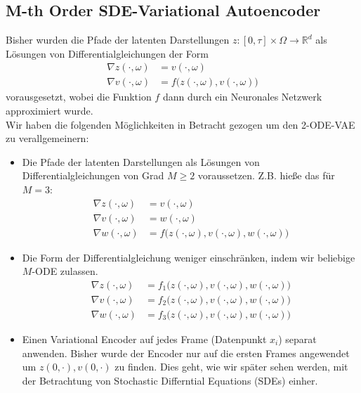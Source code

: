 \documentclass[12pt]{article}
\newcommand{\R}{\mathbb{R}}
\begin{document}
	\subsection[SDE-VAE]{M-th Order SDE-Variational Autoencoder}
	Bisher wurden die Pfade der latenten Darstellungen $z : [0,\tau] \times \Omega \rightarrow \R^d$ als Lösungen von Differentialgleichungen der Form
	\begin{align*}
	\nabla z(\cdot,\omega) &= v(\cdot,\omega)\\
	\nabla v(\cdot,\omega) &= f\big(z(\cdot,\omega),v(\cdot,\omega)\big)
	\end{align*}
	vorausgesetzt, wobei die Funktion $f$ dann durch ein Neuronales Netzwerk approximiert wurde.\\
	Wir haben die folgenden Möglichkeiten in Betracht gezogen um den 2-ODE-VAE zu verallgemeinern:
	\begin{itemize}
		\item Die Pfade der latenten Darstellungen als Lösungen von Differentialgleichungen von Grad $M \geq 2$ voraussetzen. Z.B. hieße das für $M=3$:
		\begin{align*}
		\nabla z(\cdot,\omega) &= v(\cdot,\omega)\\
		\nabla v(\cdot,\omega) &= w(\cdot,\omega)\\
		\nabla w(\cdot,\omega) &= f\big(z(\cdot,\omega),v(\cdot,\omega),w(\cdot,\omega)\big)
		\end{align*}

		\item Die Form der Differentialgleichung weniger einschränken, indem wir beliebige $M$-ODE zulassen.
		\begin{align*}
		\nabla z(\cdot,\omega) &= f_1\big(z(\cdot,\omega),v(\cdot,\omega),w(\cdot,\omega)\big)\\
		\nabla v(\cdot,\omega) &= f_2\big(z(\cdot,\omega),v(\cdot,\omega),w(\cdot,\omega)\big)\\
		\nabla w(\cdot,\omega) &= f_3\big(z(\cdot,\omega),v(\cdot,\omega),w(\cdot,\omega)\big)
		\end{align*}

		\item Einen Variational Encoder auf jedes Frame (Datenpunkt $x_i$) separat anwenden. Bisher wurde der Encoder nur auf die ersten Frames angewendet um $z(0,\cdot), v(0,\cdot)$ zu finden. Dies geht, wie wir später sehen werden, mit der Betrachtung von Stochastic Differntial Equations (SDEs) einher.
	\end{itemize}
\end{document}
